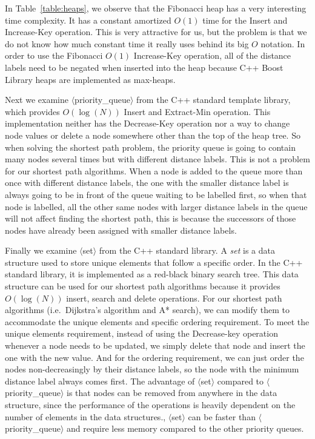In Table~\ref{table:heaps},
we observe that the Fibonacci heap has a very interesting time complexity.
It has a constant amortized $O(1)$ time for the Insert and Increase-Key operation.
This is very attractive for us,
but the problem is that we do not know how much constant time it really uses behind its big $O$ notation.
In order to use the Fibonacci $O(1)$ Increase-Key operation,
all of the distance labels need to be negated when inserted into the heap because C++ Boost Library heaps are implemented as max-heaps.

Next we examine $\langle$priority\_queue$\rangle$ from the C++ standard template library,
which provides $O(\log(N))$ Insert and Extract-Min operation.
This implementation neither has the Decrease-Key operation nor a way to change node values or delete a node somewhere other than the top of the heap tree.
So when solving the shortest path problem,
the priority queue is going to contain many nodes several times but with different distance labels.
This is not a problem for our shortest path algorithms.
When a node is added to the queue more than once with different distance labels,
the one with the smaller distance label is always going to be in front of the queue waiting to be labelled first,
so when that node is labelled,
all the other same nodes with larger distance labels in the queue will not affect finding the shortest path,
this is because the successors of those nodes have already been assigned with smaller distance labels.

Finally we examine $\langle$set$\rangle$ from the C++ standard library.
A \emph{set} is a data structure used to store unique elements that follow a specific order.
In the C++ standard library, it is implemented as a red-black binary search tree.
This data structure can be used for our shortest path algorithms because it provides $O(\log(N))$ insert, search and delete operations.
For our shortest path algorithms (i.e.\ Dijkstra's algorithm and A* search),
we can modify them to accommodate the unique elements and specific ordering requirement.
To meet the unique elements requirement,
instead of using the Decrease-key operation whenever a node needs to be updated,
we simply delete that node and insert the one with the new value.
And for the ordering requirement,
we can just order the nodes non-decreasingly by their distance labels,
so the node with the minimum distance label always comes first.
The advantage of $\langle$set$\rangle$ compared to $\langle$priority\_queue$\rangle$ is that nodes can be removed from anywhere in the data structure,
since the performance of the operations is heavily dependent on the number of elements in the data structures.,
$\langle$set$\rangle$ can be faster than $\langle$priority\_queue$\rangle$ and require less memory compared to the other priority queues.

